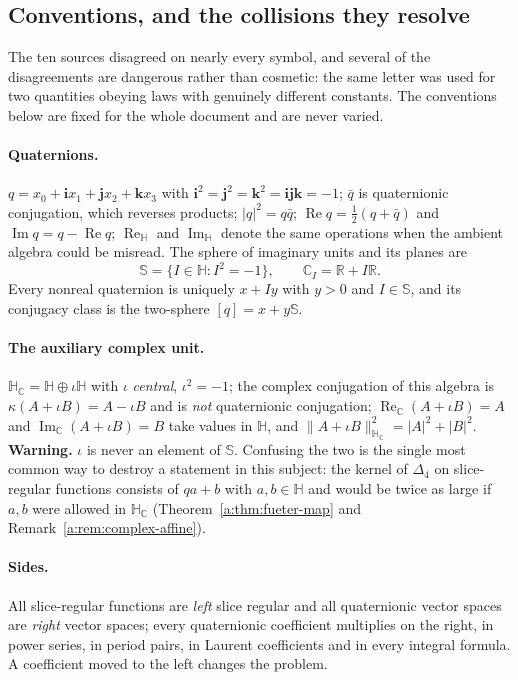 \documentclass[11pt,a4paper]{article}
\numberwithin{equation}{section}
\theoremstyle{definition}
\theoremstyle{remark}
\theoremstyle{plain}
\newcommand{\HH}{\mathbb H}
\newcommand{\HC}{\mathbb H_{\mathbb C}}
\newcommand{\RR}{\mathbb R}
\newcommand{\CC}{\mathbb C}
\newcommand{\SSS}{\mathbb S}
\DeclareMathOperator{\Rea}{Re}
\DeclareMathOperator{\Ima}{Im}
\newcommand{\ReH}{\Rea_{\HH}}
\newcommand{\ImH}{\Ima_{\HH}}
\newcommand{\ReC}{\Rea_{\CC}}
\newcommand{\lap}{\Delta_4}
\newcommand{\abs}[1]{\lvert #1\rvert}
\newcommand{\norm}[1]{\lVert #1\rVert}
\begin{document}
\subsection{Conventions, and the collisions they resolve}
\label{a:sec:notation}

The ten sources disagreed on nearly every symbol, and several of the
disagreements are dangerous rather than cosmetic: the same letter was used for
two quantities obeying laws with genuinely different constants. The
conventions below are fixed for the whole document and are never varied.

\paragraph{Quaternions.}
$q=x_0+\mathbf i x_1+\mathbf j x_2+\mathbf k x_3$ with
$\mathbf i^2=\mathbf j^2=\mathbf k^2=\mathbf i\mathbf j\mathbf k=-1$;
$\bar q$ is quaternionic conjugation, which reverses products;
$\abs q^2=q\bar q$; $\Rea q=\tfrac12(q+\bar q)$ and $\Ima q=q-\Rea q$;
$\ReH$ and $\ImH$ denote the same operations when the ambient algebra could
be misread. The sphere of imaginary units and its planes are
\[
 \SSS=\{I\in\HH: I^2=-1\},\qquad \CC_I=\RR+I\RR .
\]
Every nonreal quaternion is uniquely $x+Iy$ with $y>0$ and $I\in\SSS$, and its
conjugacy class is the two-sphere $[q]=x+y\SSS$.

\paragraph{The auxiliary complex unit.}
$\HC=\HH\oplus\iota\HH$ with $\iota$ \emph{central}, $\iota^2=-1$; the
complex conjugation of this algebra is $\kappa(A+\iota B)=A-\iota B$ and is
\emph{not} quaternionic conjugation; $\ReC(A+\iota B)=A$ and
$\Ima_{\CC}(A+\iota B)=B$ take values in $\HH$, and
$\norm{A+\iota B}_{\HC}^2=\abs A^2+\abs B^2$.
\textbf{Warning.} $\iota$ is never an element of $\SSS$. Confusing the two is
the single most common way to destroy a statement in this subject: the kernel
of $\lap$ on slice-regular functions consists of $qa+b$ with $a,b\in\HH$ and
would be twice as large if $a,b$ were allowed in $\HC$
(Theorem~\ref{a:thm:fueter-map} and Remark~\ref{a:rem:complex-affine}).

\paragraph{Sides.}
All slice-regular functions are \emph{left} slice regular and all
quaternionic vector spaces are \emph{right} vector spaces; every quaternionic
coefficient multiplies on the right, in power series, in period pairs, in
Laurent coefficients and in every integral formula. A coefficient moved to
the left changes the problem.
\end{document}

